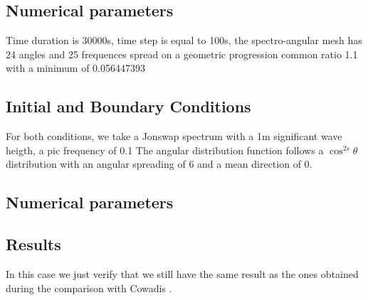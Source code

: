 %
\subsection{Numerical parameters}
%
Time duration is 30000s, time step is equal to 100s, the spectro-angular mesh
has 24 angles and 25 frequences spread on a geometric progression common ratio
1.1 with a minimum of 0.056447393

\subsection{Initial and Boundary Conditions}
%
For both conditions, we take a Jonswap spectrum with a 1m significant wave
heigth, a pic frequency of 0.1 The angular distribution function follows a
$\cos^{2s} \theta$ distribution with an angular spreading of 6 and a mean
direction of 0.

\subsection{Numerical parameters}


%
%
\subsection{Results}
In this case we just verify that we still have the same result as the ones
obtained during the comparison with Cowadis \cite{cowadis}.
